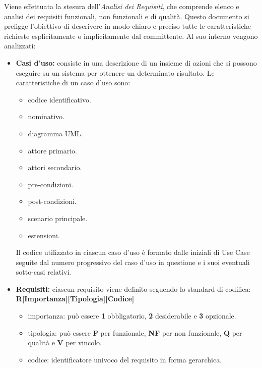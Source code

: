 \noindent Viene effettuata la stesura dell'\textit{Analisi dei Requisiti}, che comprende elenco e analisi dei requisiti funzionali, non funzionali e di qualità. Questo documento si prefigge l'obiettivo di descrivere in modo chiaro e preciso tutte le caratteristiche richieste esplicitamente o implicitamente dal committente.
    Al suo interno vengono analizzati:
    \begin{itemize}
        \item \textbf{Casi d'uso:} consiste in una descrizione di un insieme di azioni che si possono eseguire su un sistema per ottenere un determinato risultato.
        Le caratteristiche di un caso d'uso sono:
        \begin{itemize}
            \item {codice identificativo.}
            \item {nominativo.}
            \item {diagramma UML.}
            \item {attore primario.}
            \item {attori secondario.}
            \item {pre-condizioni.}
            \item {post-condizioni.}
            \item {scenario principale.}
            \item {estensioni.}
        \end{itemize}
        Il codice utilizzato in ciascun caso d'uso è formato dalle iniziali di Use Case seguite dal numero progressivo del caso d'uso in questione e i suoi eventuali sotto-casi relativi.
        \item \textbf{Requisiti:} ciascun requisito viene definito seguendo lo standard di codifica:\\
        \textbf{R[Importanza][Tipologia][Codice]}
        \begin {itemize}
            \item{importanza:} può essere \textbf{1} obbligatorio, \textbf{2} desiderabile e \textbf{3} opzionale.
            \item {tipologia:} può essere \textbf{F} per funzionale, \textbf{NF} per non funzionale, \textbf{Q} per qualità e \textbf{V} per vincolo.
            \item {codice:} identificatore univoco del requisito in forma gerarchica.
        \end {itemize}
    \end{itemize}

